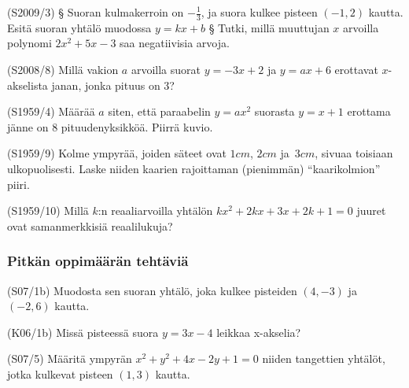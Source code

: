 \begin{tehtava}  (S2009/3)
\alakohdat
		§ Suoran kulmakerroin on $-\frac{1}{3}$, ja suora kulkee pisteen $(-1,2)$ kautta. Esitä suoran yhtälö muodossa $y=kx+b$
		§ Tutki, millä muuttujan $x$ arvoilla polynomi $2x^2+5x-3$ saa negatiivisia arvoja.
	\loppu
\end{tehtava}


\begin{tehtava}  (S2008/8)
Millä vakion $a$ arvoilla suorat $y=-3x+2$ ja $y=ax+6$ erottavat $x$-akselista janan, jonka pituus on 3?
\end{tehtava}


\begin{tehtava}  (S1959/4)
Määrää $a$ siten, että paraabelin $y=ax^2$ suorasta $y=x+1$ erottama jänne on 8 pituudenyksikköä. Piirrä kuvio.
\end{tehtava}

\begin{tehtava}(S1959/9)
Kolme ympyrää, joiden säteet ovat $1cm$, $2cm$ ja $3cm$, sivuaa toisiaan ulkopuolisesti. Laske niiden kaarien rajoittaman (pienimmän) ``kaarikolmion'' piiri. 
\end{tehtava}

\begin{tehtava}(S1959/10)
Millä $k$:n reaaliarvoilla yhtälön $kx^2+2kx+3x+2k+1=0$ juuret ovat samanmerkkisiä reaalilukuja? 
\end{tehtava}

\subsubsection*{Pitkän oppimäärän tehtäviä}

\begin{tehtava}(S07/1b)
	Muodosta sen suoran yhtälö, joka kulkee pisteiden $(4, -3)$ ja $(-2,6)$ kautta. 
\end{tehtava}

\begin{tehtava}(K06/1b)
	Missä pisteessä suora $y=3x-4$ leikkaa x-akselia? 
\end{tehtava}

\begin{tehtava} (S07/5)
	Määritä ympyrän $x^2+y^2+4x-2y+1=0$ niiden tangettien yhtälöt, jotka kulkevat pisteen $(1,3)$ kautta.
\end{tehtava}



